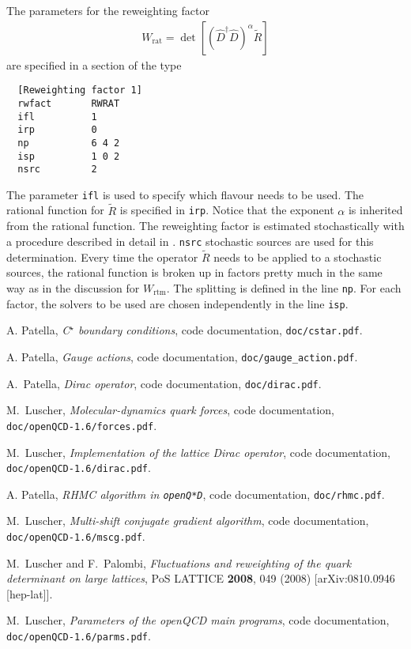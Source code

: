 \documentclass[11pt,fleqn]{article}
\newcommand{\R}{\tilde{R}}
\begin{document}
The parameters for the reweighting factor
\begin{gather}
   W_\text{rat} = \det [ (\hat{D}^\dag \hat{D})^{\alpha} \R ]
   \label{eq:Wrat}
\end{gather}
are specified in a section of the type
%
\begin{verbatim}
  [Reweighting factor 1]
  rwfact       RWRAT
  ifl          1
  irp          0
  np           6 4 2
  isp          1 0 2
  nsrc         2
\end{verbatim}
%
The parameter \texttt{ifl} is used to specify which flavour needs to be used.
The rational function for $\R$ is specified in \texttt{irp}. Notice that the
exponent $\alpha$ is inherited from the rational function. The reweighting
factor is estimated stochastically with a procedure described in detail in
\cite{rhmc}. \texttt{nsrc} stochastic sources are used for this determination.
Every time the operator $\R$ needs to be applied to a stochastic sources, the
rational function is broken up in factors pretty much in the same way as in the
discussion for $W_\text{rtm}$. The splitting is defined in the line \texttt{np}.
For each factor, the solvers to be used are chosen independently in the line
\texttt{isp}.




\begin{thebibliography}{9}

  A. Patella,
  \textit{C$^\star$ boundary conditions}, code documentation,
  \texttt{doc/cstar.pdf}.

  A. Patella,
  \textit{Gauge actions}, code documentation,
  \texttt{doc/gauge\_action.pdf}.

  A.~Patella,
  \textit{Dirac operator}, code documentation,
  \texttt{doc/dirac.pdf}.

  M.~Luscher,
  \textit{Molecular-dynamics quark forces}, code documentation,
  \texttt{doc/openQCD-1.6/forces.pdf}.

  M.~Luscher,
  \textit{Implementation of the lattice Dirac operator}, code documentation,
  \texttt{doc/openQCD-1.6/dirac.pdf}.

  A. Patella,
  \textit{RHMC algorithm in \texttt{openQ*D}}, code documentation,
  \texttt{doc/rhmc.pdf}.

  M.~Luscher,
  \textit{Multi-shift conjugate gradient algorithm}, code documentation,
  \texttt{doc/openQCD-1.6/mscg.pdf}.

  M.~Luscher and F.~Palombi,
  \textit{Fluctuations and reweighting of the quark determinant on large lattices},
  PoS LATTICE {\bf 2008}, 049 (2008)
  [arXiv:0810.0946 [hep-lat]].

  M.~Luscher,
  \textit{Parameters of the openQCD main programs}, code documentation,
  \texttt{doc/openQCD-1.6/parms.pdf}.

\end{thebibliography}
\end{document}

